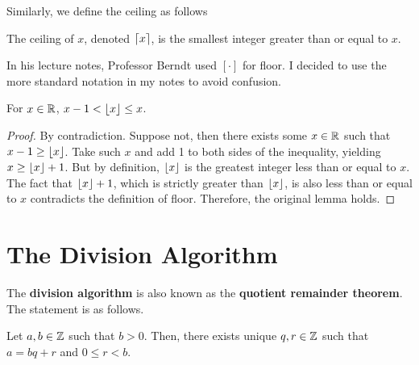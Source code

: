 Similarly, we define the ceiling as follows

\begin{definition}[Ceiling]
    The ceiling of $x$, denoted $\lceil x\rceil$, is the smallest integer greater than or equal to $x$.
\end{definition}

\begin{remark}
    In his lecture notes, Professor Berndt used $[\cdot]$ for floor. I decided to use the more standard notation in my notes to avoid confusion.
\end{remark}

\begin{lemma} \label{lem:div-algo-lem1}
    For $x \in \mathbb{R}$, $x-1 < \lfloor x\rfloor \leq x$.
\end{lemma}

\begin{proof}
    By contradiction. Suppose not, then there exists some $x \in \mathbb{R}$ such that $x-1 \geq \lfloor x\rfloor$. Take such $x$ and add 1 to both sides of the inequality, yielding $x \geq \lfloor x\rfloor + 1$. But by definition, $\lfloor x\rfloor$ is the greatest integer less than or equal to $x$. The fact that $\lfloor x\rfloor+1$, which is strictly greater than $\lfloor x\rfloor$, is also less than or equal to $x$ contradicts the definition of floor. Therefore, the original lemma holds. 
\end{proof}

\section{The Division Algorithm}

The \textbf{division algorithm} is also known as the \textbf{quotient remainder theorem}. The statement is as follows.

\begin{theorem}
    Let $a,b \in \mathbb{Z}$ such that $b > 0$. Then, there exists unique $q,r \in \mathbb{Z}$ such that $a = bq + r$ and $0 \leq r < b$.    
\end{theorem}

